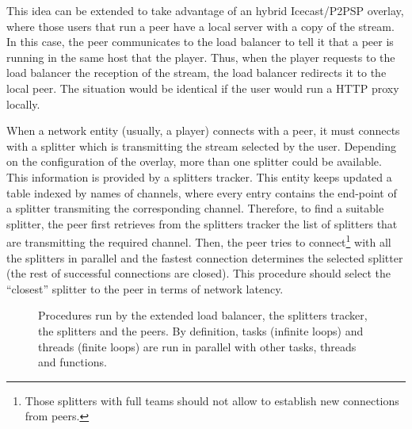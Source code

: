This idea can be extended to take advantage of an hybrid Icecast/P2PSP
overlay, where those users that run a peer have a local server with a
copy of the stream. In this case, the peer communicates to the load
balancer to tell it that a peer is running in the same host that the
player. Thus, when the player requests to the load balancer the
reception of the stream, the load balancer redirects it to the local
peer. The situation would be identical if the user would run a HTTP
proxy locally.

When a network entity (usually, a player) connects with a peer, it
must connects with a splitter which is transmitting the stream
selected by the user. Depending on the configuration of the overlay,
more than one splitter could be available. This information is
provided by a splitters tracker. This entity keeps updated a table
indexed by names of channels, where every entry contains the end-point
of a splitter transmiting the corresponding channel. Therefore, to
find a suitable splitter, the peer first retrieves from the splitters
tracker the list of splitters that are transmitting the required
channel. Then, the peer tries to connect\footnote{Those splitters with
  full teams should not allow to establish new connections from
  peers.} with all the splitters in parallel and the fastest
connection determines the selected splitter (the rest of successful
connections are closed). This procedure should select the ``closest''
splitter to the peer in terms of network latency.

\begin{figure*}
   \caption{Procedures run by the extended load
    balancer, the splitters tracker, the splitters and the peers. By
    definition, tasks (infinite loops) and threads (finite loops) are
    run in parallel with other tasks, threads and
    functions. \label{fig:TTS}}
\end{figure*}

